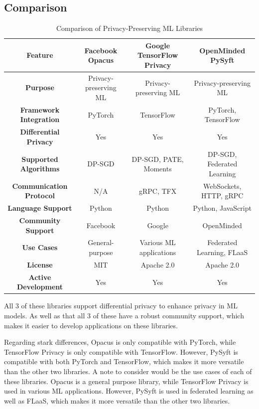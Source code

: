 \documentclass[conference]{IEEEtran}
\begin{document}
\subsection{Comparison}

\begin{table}[h]
    \renewcommand{\arraystretch}{1.3}
    \caption{Comparison of Privacy-Preserving ML Libraries}
    \centering
    \begin{tabular}{|c|c|c|c|}
    \hline
    \textbf{Feature} & \textbf{Facebook Opacus} & \textbf{Google TensorFlow Privacy} & \textbf{OpenMinded PySyft} \\
    \hline
    \textbf{Purpose} & Privacy-preserving ML & Privacy-preserving ML & Privacy-preserving ML \\
    \hline
    \textbf{Framework Integration} & PyTorch & TensorFlow & PyTorch, TensorFlow \\
    \hline
    \textbf{Differential Privacy} & Yes & Yes & Yes \\
    \hline
    \textbf{Supported Algorithms} & DP-SGD & DP-SGD, PATE, Moments & DP-SGD, Federated Learning \\
    \hline
    \textbf{Communication Protocol} & N/A & gRPC, TFX & WebSockets, HTTP, gRPC \\
    \hline
    \textbf{Language Support} & Python & Python & Python, JavaScript \\
    \hline
    \textbf{Community Support} & Facebook & Google & OpenMinded \\
    \hline
    \textbf{Use Cases} & General-purpose & Various ML applications & Federated Learning, FLaaS \\
    \hline
    \textbf{License} & MIT & Apache 2.0 & Apache 2.0 \\
    \hline
    \textbf{Active Development} & Yes & Yes & Yes \\
    \hline
    \end{tabular}
\end{table}

All 3 of these libraries support differential privacy to enhance privacy in ML
models. As well as that all 3 of these have a robust community support, which
makes it easier to develop applications on these libraries.

Regarding stark differences, Opacus is only compatible with PyTorch, while
TensorFlow Privacy is only compatible with TensorFlow. However, PySyft is
compatible with both PyTorch and TensorFlow, which makes it more versatile than
the other two libraries. A note to consider would be the use cases of each of
these libraries. Opacus is a general purpose library, while TensorFlow Privacy
is used in various ML applications. However, PySyft is used in federated
learning as well as FLaaS, which makes it more versatile than the other two
libraries.
\end{document}
